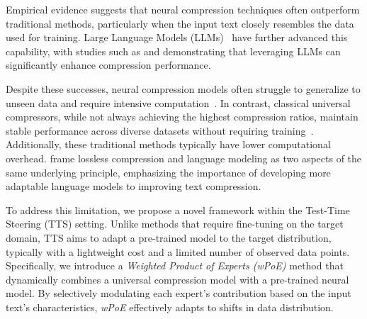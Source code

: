 \documentclass[11pt]{article}
\begin{document}
Empirical evidence suggests that neural compression techniques often outperform traditional methods, particularly when the input text closely resembles the data used for training. 
Large Language Models (LLMs)~\citep{gpt2,gpt4,llama3} have further advanced this capability, with studies such as \cite{lmic} and \cite{llmzip} demonstrating that leveraging LLMs can significantly enhance compression performance.

Despite these successes, neural compression models often struggle to generalize to  unseen data and require intensive computation~\citep{heurteldepeiges2024compressionpretrainedtransformersstudy}. In contrast, classical universal compressors, while not always achieving the highest compression ratios, maintain stable performance across diverse datasets without requiring training~\citep{lmic,heurteldepeiges2024compressionpretrainedtransformersstudy}. Additionally, these traditional methods typically have lower computational overhead.
\citet{mackay2003information,lmic} frame lossless compression and language modeling as two aspects of the same underlying principle, emphasizing the importance of developing more adaptable language models to improving text compression. 


To address this limitation, we propose a novel framework within the Test-Time Steering (TTS) setting. 
Unlike methods that require fine-tuning on the target domain, TTS aims to adapt a pre-trained model to the target distribution, typically with a lightweight cost and a limited number of observed data points.
Specifically, we introduce a \emph{Weighted Product of Experts (wPoE)} method that dynamically combines a universal compression model with a pre-trained neural model. 
By selectively modulating each expert’s contribution based on the input text’s characteristics, \textit{wPoE} effectively adapts to shifts in data distribution. 
\end{document}
